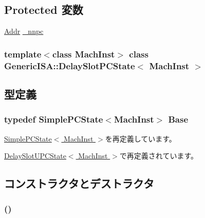 \subsection*{Protected 変数}
\begin{DoxyCompactItemize}
\item 
\hyperlink{base_2types_8hh_af1bb03d6a4ee096394a6749f0a169232}{Addr} \hyperlink{classGenericISA_1_1DelaySlotPCState_a00ba864f85426f814e862055643f861f}{\_\-nnpc}
\end{DoxyCompactItemize}
\subsubsection*{template$<$class MachInst$>$ class GenericISA::DelaySlotPCState$<$ MachInst $>$}



\subsection{型定義}
\hypertarget{classGenericISA_1_1DelaySlotPCState_a6d61e15302422cb743d88ee2ca4fd482}{
\subsubsection[{Base}]{\setlength{\rightskip}{0pt plus 5cm}typedef {\bf SimplePCState}$<$MachInst$>$ {\bf Base}}}
\label{classGenericISA_1_1DelaySlotPCState_a6d61e15302422cb743d88ee2ca4fd482}


\hyperlink{classGenericISA_1_1SimplePCState_aa75666a3abd25e3bd389680193c6e8e6}{SimplePCState$<$ MachInst $>$}を再定義しています。

\hyperlink{classGenericISA_1_1DelaySlotUPCState_a79462b82fdf9d7f85047aab294b849d8}{DelaySlotUPCState$<$ MachInst $>$}で再定義されています。

\subsection{コンストラクタとデストラクタ}
\hypertarget{classGenericISA_1_1DelaySlotPCState_a15af51f460b55a13caae04a26df39fe6}{
\subsubsection[{DelaySlotPCState}]{ ()}}
\label{classGenericISA_1_1DelaySlotPCState_a15af51f460b55a13caae04a26df39fe6}



